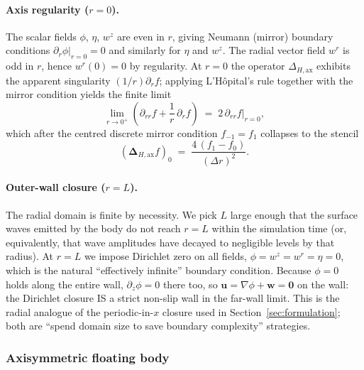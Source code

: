 \documentclass{article}
\newcommand{\uu}{\mathbf{u}}
\newcommand{\ww}{\mathbf{w}}
\begin{document}
\paragraph{Axis regularity ($r = 0$).}
The scalar fields $\phi$, $\eta$, $w^z$ are even in $r$, giving Neumann (mirror) boundary conditions $\partial_r \phi|_{r=0} = 0$ and similarly for $\eta$ and $w^z$.
The radial vector field $w^r$ is odd in $r$, hence $w^r(0) = 0$ by regularity.
At $r = 0$ the operator $\Delta_{H,\mathrm{ax}}$ exhibits the apparent singularity $(1/r)\partial_r f$; applying L'H\^opital's rule together with the mirror condition yields the finite limit
\begin{equation}
    \lim_{r \to 0^+}\left(\partial_{rr} f + \frac{1}{r}\,\partial_r f\right) \;=\; 2\,\partial_{rr} f\big|_{r=0},
    \label{eq:Lhopital_axis}
\end{equation}
which after the centred discrete mirror condition $f_{-1} = f_1$ collapses to the stencil
\begin{equation}
    (\bm{\Delta}_{H,\mathrm{ax}} f)_0 \;=\; \frac{4\,(f_1 - f_0)}{(\Delta r)^2}.
    \label{eq:Delta_H_axi_at_axis}
\end{equation}

\paragraph{Outer-wall closure ($r = L$).}
The radial domain is finite by necessity.
We pick $L$ large enough that the surface waves emitted by the body do not reach $r = L$ within the simulation time (or, equivalently, that wave amplitudes have decayed to negligible levels by that radius).
At $r = L$ we impose Dirichlet zero on all fields, $\phi = w^z = w^r = \eta = 0$, which is the natural ``effectively infinite'' boundary condition.
Because $\phi = 0$ holds along the entire wall, $\partial_z \phi = 0$ there too, so $\uu = \nabla\phi + \ww = \bm{0}$ on the wall: the Dirichlet closure IS a strict non-slip wall in the far-wall limit.
This is the radial analogue of the periodic-in-$x$ closure used in Section~\ref{sec:formulation}; both are ``spend domain size to save boundary complexity'' strategies.

\subsubsection{Axisymmetric floating body}
\label{sec:axisymm_body}
\end{document}
